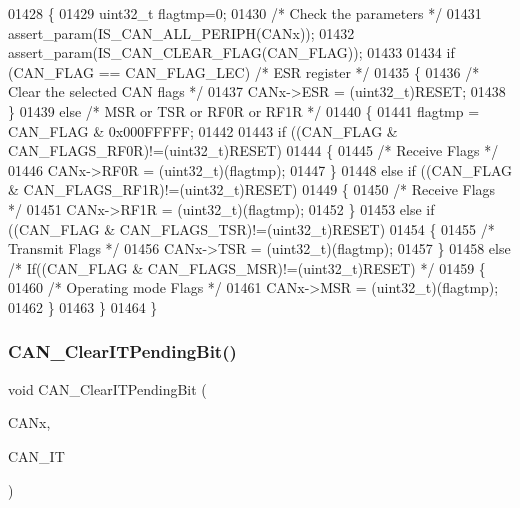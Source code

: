 \begin{DoxyCode}
01428 \{
01429   uint32\_t flagtmp=0;
01430   \textcolor{comment}{/* Check the parameters */}
01431   assert_param(IS_CAN_ALL_PERIPH(CANx));
01432   assert_param(IS_CAN_CLEAR_FLAG(CAN\_FLAG));
01433   
01434   \textcolor{keywordflow}{if} (CAN\_FLAG == CAN_FLAG_LEC) \textcolor{comment}{/* ESR register */}
01435   \{
01436     \textcolor{comment}{/* Clear the selected CAN flags */}
01437     CANx->ESR = (uint32\_t)RESET;
01438   \}
01439   \textcolor{keywordflow}{else} \textcolor{comment}{/* MSR or TSR or RF0R or RF1R */}
01440   \{
01441     flagtmp = CAN\_FLAG & 0x000FFFFF;
01442 
01443     \textcolor{keywordflow}{if} ((CAN\_FLAG & CAN_FLAGS_RF0R)!=(uint32\_t)RESET)
01444     \{
01445       \textcolor{comment}{/* Receive Flags */}
01446       CANx->RF0R = (uint32\_t)(flagtmp);
01447     \}
01448     \textcolor{keywordflow}{else} \textcolor{keywordflow}{if} ((CAN\_FLAG & CAN_FLAGS_RF1R)!=(uint32\_t)RESET)
01449     \{
01450       \textcolor{comment}{/* Receive Flags */}
01451       CANx->RF1R = (uint32\_t)(flagtmp);
01452     \}
01453     \textcolor{keywordflow}{else} \textcolor{keywordflow}{if} ((CAN\_FLAG & CAN_FLAGS_TSR)!=(uint32\_t)RESET)
01454     \{
01455       \textcolor{comment}{/* Transmit Flags */}
01456       CANx->TSR = (uint32\_t)(flagtmp);
01457     \}
01458     \textcolor{keywordflow}{else} \textcolor{comment}{/* If((CAN\_FLAG & CAN\_FLAGS\_MSR)!=(uint32\_t)RESET) */}
01459     \{
01460       \textcolor{comment}{/* Operating mode Flags */}
01461       CANx->MSR = (uint32\_t)(flagtmp);
01462     \}
01463   \}
01464 \}
\end{DoxyCode}
\mbox{\label{group__CAN__Group6_ga30bf7ac0c1793f6622a4a1adbb7dbc8a}} 
\subsubsection{C\+A\+N\+\_\+\+Clear\+I\+T\+Pending\+Bit()}
{\footnotesize\ttfamily void C\+A\+N\+\_\+\+Clear\+I\+T\+Pending\+Bit (\begin{DoxyParamCaption}\item[{\textbf{ C\+A\+N\+\_\+\+Type\+Def} $\ast$}]{C\+A\+Nx,  }\item[{uint32\+\_\+t}]{C\+A\+N\+\_\+\+IT }\end{DoxyParamCaption})}



